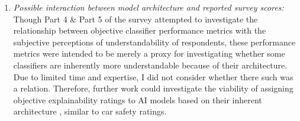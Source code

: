 \begin{enumerate}
    \item \textit{Possible interaction between model architecture and reported survey scores:} Though Part 4 \& Part 5 of the survey attempted to investigate the relationship between objective classifier performance metrics with the subjective perceptions of understandability of respondents, these performance metrics were intended to be merely a proxy for investigating whether some classifiers are inherently more understandable because of their architecture. Due to limited time and expertise, I did not consider whether there such was a relation. Therefore, further work could investigate the viability of assigning objective explainability ratings to AI models based on their inherent architecture \cite{waltl2018}, similar to car safety ratings. 
\end{enumerate}

